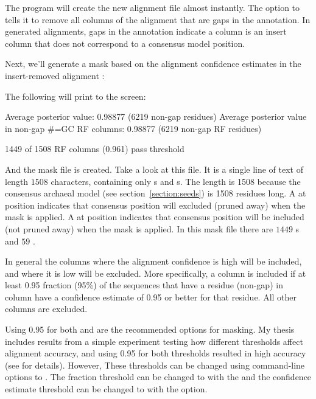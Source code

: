 The program will create the new alignment file
 almost instantly. 
The  option to  tells it to remove all
columns of the alignment that are gaps in the 
annotation. In  generated alignments, gaps in the
 annotation indicate a column is an insert column that
does not correspond to a consensus model position.

Next, we'll generate a mask based on the alignment confidence estimates
in the insert-removed alignment :


The following will print to the screen:

\begin{sreoutput}
Average posterior value:                            0.98877 (6219 non-gap residues)
Average posterior value in non-gap #=GC RF columns: 0.98877 (6219 non-gap RF residues)

1449 of 1508 RF columns (0.961) pass threshold
\end{sreoutput}

And the mask file  is created. Take a look at this
file. It is a single line of text of length $1508$ characters,
containing only s and s. The length is 1508 because
the consensus archaeal model (see section~\ref{section:seeds}) is 1508 residues
long. A  at position  indicates that consensus position 
will excluded (pruned away) when the mask is applied. A  at
position  indicates that consensus position  will be included (not
pruned away) when the mask is applied. In this mask file there are
$1449$ s and $59$ .

In general the columns where the alignment confidence is high will be
included, and where it is low will be excluded. More specifically, a
column  is included if at least 0.95 fraction (95\%)
of the sequences that have a residue (non-gap) in column  have a
confidence estimate of 0.95 or better for that residue. All other
columns are excluded.

Using 0.95 for both  and  are the
recommended options for masking. My thesis includes results from 
a simple experiment testing how different thresholds affect
alignment accuracy, and using 0.95 for both thresholds resulted in 
high accuracy (see \cite{Nawrocki09b} for details).
However, These thresholds can be changed using command-line options to 
. The fraction threshold can be changed to
 with the  and the confidence estimate
threshold can be changed to  with the 
option.

